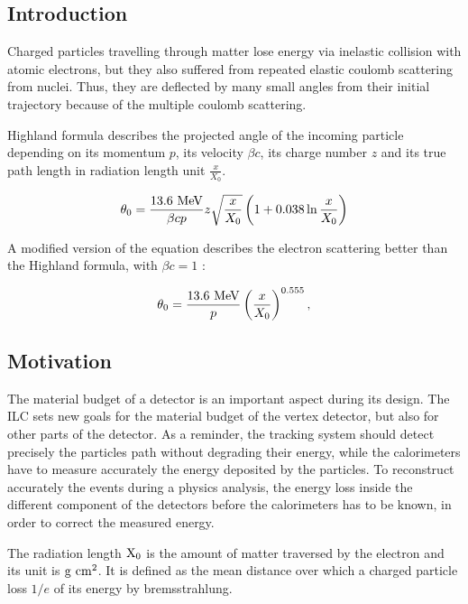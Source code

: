     \subsection{Introduction}

    Charged particles travelling through matter lose energy via inelastic collision with atomic electrons, but they also suffered from repeated elastic coulomb scattering from nuclei.
    Thus, they are deflected by many small angles from their initial trajectory because of the multiple coulomb scattering.

    Highland formula describes the projected angle of the incoming particle depending on its momentum $p$, its velocity $\beta c$, its charge number $z$ and its true path length in radiation length unit $\frac{x}{X_{0}}$.

    \begin{equation}
      \theta_{0} = \frac{13.6~\rm{MeV}}{\beta c p} z \sqrt{\frac{x}{X_{0}}}\left(1 + 0.038 \ln{\frac{x}{X_{0}}}\right)
    \end{equation}

    A modified version of the equation describes the electron scattering better than the Highland formula, with $\beta c = 1$ \cite{GEANT4}:

    \begin{equation}
      \theta_{0} = \frac{13.6~\rm{MeV}}{p}\left(\frac{x}{X_{0}}\right)^{0.555},
    \end{equation}

    \subsection{Motivation}

    The material budget of a detector is an important aspect during its design.
    The \gls{ILC} sets new goals for the material budget of the vertex detector, but also for other parts of the detector.
    As a reminder, the tracking system should detect precisely the particles path without degrading their energy, while the calorimeters have to measure accurately the energy deposited by the particles.
    To reconstruct accurately the events during a physics analysis, the energy loss inside the different component of the detectors before the calorimeters has to be known, in order to correct the measured energy.

    The radiation length $\rm{X_{0}}$ is the amount of matter traversed by the electron and its unit is $\rm{g}~{cm}^{2}$.
    It is defined as the mean distance over which a charged particle loss $1/e$ of its energy by bremsstrahlung.

